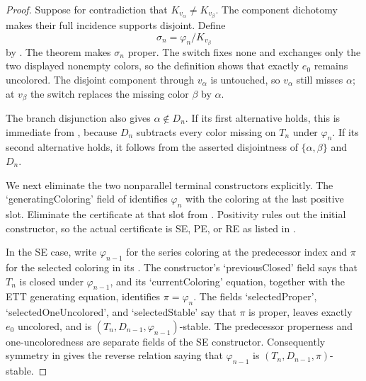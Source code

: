 \begin{proof}
Suppose for contradiction that $K_{v_\alpha}\ne K_{v_\beta}$.  The
component dichotomy  makes their full
incidence supports disjoint.  Define
\[
                 \sigma_n=\varphi_n/K_{v_\beta}
\]
by .  The theorem
 makes $\sigma_n$ proper.  The switch
fixes \textsf{none} and exchanges only the two displayed nonempty colors,
so the definition  shows that exactly $e_0$
remains uncolored.  The disjoint component through $v_\alpha$ is untouched,
so $v_\alpha$ still misses $\alpha$; at $v_\beta$ the switch replaces the
missing color $\beta$ by $\alpha$.

The branch disjunction also gives $\alpha\notin D_n$.  If its first
alternative holds, this is immediate from
, because $D_n$ subtracts every color missing
on $T_n$ under $\varphi_n$.  If its second alternative holds, it follows
from the asserted disjointness of $\{\alpha,\beta\}$ and $D_n$.

We next eliminate the two nonparallel terminal constructors explicitly.
The `generatingColoring' field of  identifies
$\varphi_n$ with the coloring at the last positive slot.  Eliminate the
certificate at that slot from .  Positivity rules
out the initial constructor, so the actual certificate is SE, PE, or RE as
listed in .

In the SE case, write $\varphi_{n-1}$ for the series coloring at the
predecessor index and $\pi$ for the selected coloring in its
.  The
constructor's `previousClosed' field says that $T_n$ is closed under
$\varphi_{n-1}$, and its `currentColoring' equation, together with the ETT
generating equation, identifies $\pi=\varphi_n$.  The fields
`selectedProper', `selectedOneUncolored', and `selectedStable' say that
$\pi$ is proper, leaves exactly $e_0$ uncolored, and is
$(T_n,D_{n-1},\varphi_{n-1})$-stable.  The predecessor properness and
one-uncoloredness are separate fields of the SE constructor.  Consequently
symmetry in  gives the reverse relation saying that
$\varphi_{n-1}$ is $(T_n,D_{n-1},\pi)$-stable.


\end{proof}
